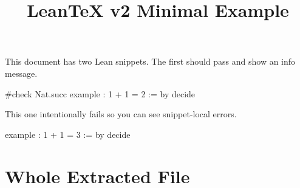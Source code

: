 \documentclass{article}
\title{LeanTeX v2 Minimal Example}
\date{}
\begin{document}
\maketitle

This document has two Lean snippets. The first should pass and show an info message.

\begin{lean}[name=ok,show=both]
#check Nat.succ
example : 1 + 1 = 2 := by decide
\end{lean}

This one intentionally fails so you can see snippet-local errors.

\begin{lean}[name=bad,show=both]
example : 1 + 1 = 3 := by
  decide
\end{lean}

\section*{Whole Extracted File}

\totalinfoview
\end{document}
